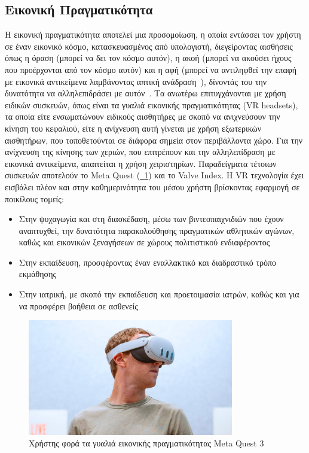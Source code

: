 \subsection{Εικονική Πραγματικότητα}\label{subsec:virtualReality}
Η εικονική πραγματικότητα αποτελεί μια προσομοίωση, η οποία εντάσσει τον χρήστη σε έναν εικονικό κόσμο, κατασκευασμένος από υπολογιστή, διεγείροντας αισθήσεις όπως η όραση (μπορεί να δει τον κόσμο αυτόν), η ακοή (μπορεί να ακούσει ήχους που προέρχονται από τον κόσμο αυτόν) και η αφή (μπορεί να αντιληφθεί την επαφή με εικονικά αντικείμενα λαμβάνοντας απτική ανάδραση~\cite{weiler_2023_phantom}\cite{perret_2018_touching}), δίνοντάς του την δυνατότητα να αλληλεπιδράσει με αυτόν~\cite{lowood_2018_virtual}. Τα ανωτέρω επιτυγχάνονται με χρήση ειδικών συσκευών, όπως είναι τα γυαλιά εικονικής πραγματικότητας (VR headsets), τα οποία είτε ενσωματώνουν ειδικούς αισθητήρες με σκοπό να ανιχνεύσουν την κίνηση του κεφαλιού, είτε η ανίχνευση αυτή γίνεται με χρήση εξωτερικών αισθητήρων, που τοποθετούνται σε διάφορα σημεία στον περιβάλλοντα χώρο. Για την ανίχνευση της κίνησης των χεριών, που επιτρέπουν και την αλληλεπίδραση με εικονικά αντικείμενα, απαιτείται η χρήση χειριστηρίων. Παραδείγματα τέτοιων συσκευών αποτελούν το Meta Quest (\hyperref[fig:meta_quest_3]{\schema~\ref*{fig:meta_quest_3}}) και το Valve Index. Η VR τεχνολογία έχει εισβάλει πλέον και στην καθημερινότητα του μέσου χρήστη βρίσκοντας εφαρμογή σε ποικίλους τομείς:
\begin{itemize}
    \item Στην ψυχαγωγία και στη διασκέδαση, μέσω των βιντεοπαιχνιδιών που έχουν αναπτυχθεί, την δυνατότητα παρακολούθησης πραγματικών αθλητικών αγώνων, καθώς και εικονικών ξεναγήσεων σε χώρους πολιτιστικού ενδιαφέροντος~\cite{loeffler_1993_distributed}\cite{meta_2022_xtadium}\cite{ansari_2021_implementing}
    \item Στην εκπαίδευση, προσφέροντας έναν εναλλακτικό και διαδραστικό τρόπο εκμάθησης~\cite{hamad_2022_how}\cite{kavanagh_2017_a}\cite{freina_2015_a}
    \item Στην ιατρική, με σκοπό την εκπαίδευση και προετοιμασία ιατρών, καθώς και για να προσφέρει βοήθεια σε ασθενείς~\cite{chirico_2015_virtual}\cite{hamad_2022_how}\cite{snoswell_2019_immersive}\cite{gerup_2020_augmented}
\end{itemize}
\begin{figure}[!h]
    \centering
    \includegraphics[width=90mm]{images/meta_quest_3.jpg}
    \caption{Χρήστης φορά τα γυαλιά εικονικής πραγματικότητας Meta Quest 3}\label{fig:meta_quest_3}
\end{figure}

